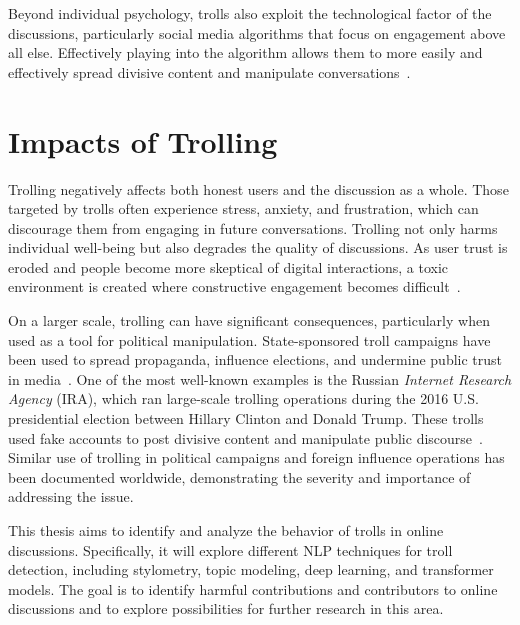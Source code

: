 \documentclass[twoside]{ctuthesis}
\theoremstyle{plain}
\theoremstyle{definition}
\theoremstyle{note}
\begin{document}
Beyond individual psychology, trolls also exploit the technological factor of the discussions, particularly social media algorithms that focus on engagement above all else. Effectively playing into the algorithm allows them to more easily and effectively spread divisive content and manipulate conversations~\cite{GolfPapez2017DontFeedTheTroll}.\par

\section{Impacts of Trolling}
Trolling negatively affects both honest users and the discussion as a whole. Those targeted by trolls often experience stress, anxiety, and frustration, which can discourage them from engaging in future conversations. Trolling not only harms individual well-being but also degrades the quality of discussions. As user trust is eroded and people become more skeptical of digital interactions, a toxic environment is created where constructive engagement becomes difficult~\cite{GolfPapez2017DontFeedTheTroll}.\par

On a larger scale, trolling can have significant consequences, particularly when used as a tool for political manipulation. State-sponsored troll campaigns have been used to spread propaganda, influence elections, and undermine public trust in media~\cite{Bradshaw2017TroopsTrolls}. One of the most well-known examples is the Russian \textit{Internet Research Agency} (IRA), which ran large-scale trolling operations during the 2016 U.S. presidential election between Hillary Clinton and Donald Trump. These trolls used fake accounts to post divisive content and manipulate public discourse~\cite{Linvill2020IRATrolls}. Similar use of trolling in political campaigns and foreign influence operations has been documented worldwide, demonstrating the severity and importance of addressing the issue.\par

This thesis aims to identify and analyze the behavior of trolls in online discussions. Specifically, it will explore different NLP techniques for troll detection, including stylometry, topic modeling, deep learning, and transformer models. The goal is to identify harmful contributions and contributors to online discussions and to explore possibilities for further research in this area.\par

\end{document}
